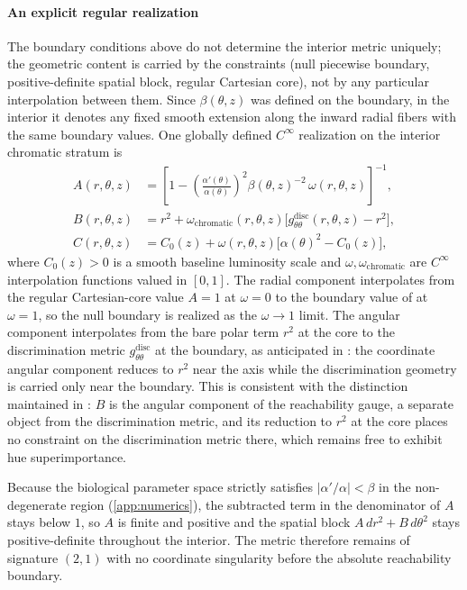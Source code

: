 \documentclass[preprint,12pt,authoryear]{elsarticle}
\theoremstyle{plain}
\theoremstyle{definition}
\theoremstyle{remark}
\begin{document}
\paragraph{An explicit regular realization}
The boundary conditions above do not determine the interior metric uniquely; the geometric content is carried by the constraints (null piecewise boundary, positive-definite spatial block, regular Cartesian core), not by any particular interpolation between them. Since $\beta(\theta,z)$ was defined on the boundary, in the interior it denotes any fixed smooth extension along the inward radial fibers with the same boundary values. One globally defined $C^\infty$ realization on the interior chromatic stratum is
\begin{align*}
A(r,\theta,z)
&=
\left[
1-
\left(\frac{\alpha'(\theta)}{\alpha(\theta)}\right)^2
\beta(\theta,z)^{-2}\,
\omega(r,\theta,z)
\right]^{-1},
\\
B(r,\theta,z)
&=
r^2+
\omega_{\mathrm{chromatic}}(r,\theta,z)
\bigl[
g_{\theta\theta}^{\mathrm{disc}}(r,\theta,z)-r^2
\bigr],
\\
C(r,\theta,z)
&=
C_0(z)+
\omega(r,\theta,z)
\bigl[
\alpha(\theta)^2-C_0(z)
\bigr],
\end{align*}
where $C_0(z)>0$ is a smooth baseline luminosity scale and $\omega,\omega_{\mathrm{chromatic}}$ are $C^\infty$ interpolation functions valued in $[0,1]$. The radial component interpolates from the regular Cartesian-core value $A=1$ at $\omega=0$ to the boundary value of  at $\omega=1$, so the null boundary is realized as the $\omega\to 1$ limit. The angular component interpolates from the bare polar term $r^2$ at the core to the discrimination metric $g_{\theta\theta}^{\mathrm{disc}}$ at the boundary, as anticipated in : the coordinate angular component reduces to $r^2$ near the axis while the discrimination geometry is carried only near the boundary. This is consistent with the distinction maintained in : $B$ is the angular component of the reachability gauge, a separate object from the discrimination metric, and its reduction to $r^2$ at the core places no constraint on the discrimination metric there, which remains free to exhibit hue superimportance.

Because the biological parameter space strictly satisfies $|\alpha'/\alpha|<\beta$ in the non-degenerate region (\ref{app:numerics}), the subtracted term in the denominator of $A$ stays below $1$, so $A$ is finite and positive and the spatial block $A\,dr^2+B\,d\theta^2$ stays positive-definite throughout the interior. The metric therefore remains of signature $(2,1)$ with no coordinate singularity before the absolute reachability boundary.
\end{document}

